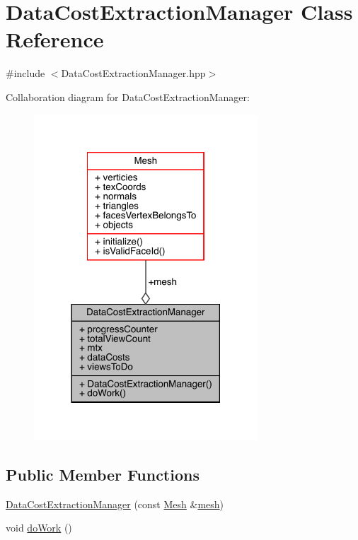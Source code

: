 \hypertarget{class_data_cost_extraction_manager}{}\section{Data\+Cost\+Extraction\+Manager Class Reference}
\label{class_data_cost_extraction_manager}


{\ttfamily \#include $<$Data\+Cost\+Extraction\+Manager.\+hpp$>$}



Collaboration diagram for Data\+Cost\+Extraction\+Manager\+:\nopagebreak
\begin{figure}[H]
\begin{center}
\leavevmode
\includegraphics[width=237pt]{class_data_cost_extraction_manager__coll__graph}
\end{center}
\end{figure}
\subsection*{Public Member Functions}
\begin{DoxyCompactItemize}
\item 
\hyperlink{class_data_cost_extraction_manager_a90368fe041fe99c6ee45531ca69ae036}{Data\+Cost\+Extraction\+Manager} (const \hyperlink{class_mesh}{Mesh} \&\hyperlink{class_data_cost_extraction_manager_afa915680af20f1ac535cbc3205f7c35a}{mesh})
\item 
void \hyperlink{class_data_cost_extraction_manager_a078e39ed154e6337584a2506a87c35e7}{do\+Work} ()
\end{DoxyCompactItemize}
